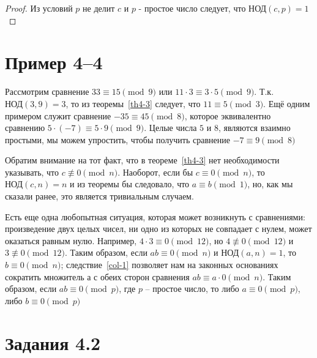 \documentclass[11pt]{article}
\begin{document}
\begin{proof}
	Из условий $p$ не делит $c$ и $p$ - простое число следует, что $\text{НОД} (c,p) = 1$
\end{proof}

\section*{Пример 4--4}

Рассмотрим сравнение $33\equiv 15 \pmod 9$ или $11\cdot3\equiv 3\cdot5 \pmod 9$. Т.к. $\text{НОД} (3,9) = 3$, то из теоремы~\ref{th4-3} следует, что $11\equiv 5 \pmod 3$. Ещё одним примером служит сравнение ${-35\equiv 45 \pmod 8}$, которое эквивалентно сравнению $5\cdot(-7)\equiv 5\cdot9 \pmod 9$. Целые числа $5$ и $8$, являются взаимно простыми, мы можем упростить, чтобы получить сравнение $-7\equiv 9 \pmod8$


\thispagestyle{fancy}
\rhead{\thepage}

Обратим внимание на тот факт, что в теореме~\ref{th4-3} нет необходимости указывать, что  ${c \not\equiv 0 \pmod n}$.
Наоборот, если бы  $c \equiv 0 \pmod n$, то $\text{НОД} (c,n) = n$ и из теоремы бы следовало, что  $a\equiv b \pmod 1$, но, как мы сказали ранее, это является тривиальным случаем.

Есть еще одна любопытная ситуация, которая может возникнуть с сравнениями: произведение двух целых чисел, ни одно из которых не совпадает с нулем, может оказаться равным нулю. Например, $4\cdot 3\equiv0 \pmod {12}$, но $4\not\equiv0 \pmod {12}$ и $3\not\equiv0 \pmod {12}$. Таким образом, если $ab\equiv0\pmod n$ и $\text{НОД} (a,n) = 1$, то $b\equiv0\pmod n$; следствие~\ref{col-1} позволяет нам на законных основаниях сократить множитель $а$ с обеих сторон сравнения
$ab\equiv a\cdot0\pmod n$. Таким образом, если $ab\equiv0\pmod p$, где $p$ -- простое число, то либо $a\equiv0\pmod p$, либо $b\equiv0\pmod p$

\section* {\center Задания 4.2}
\end{document}
